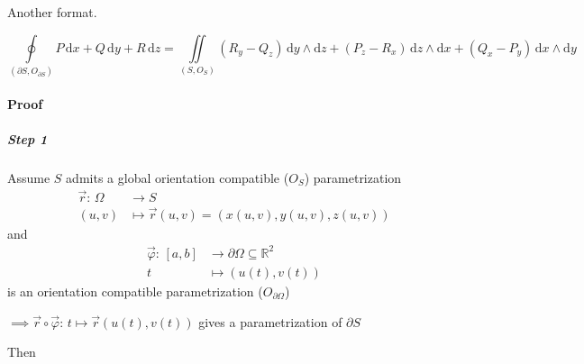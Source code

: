 Another format.

$$
    \oint\limits_{(\partial S,O_{\partial S})}P\,\mathrm{d}x+Q\,\mathrm{d}y+R\,\mathrm{d}z=\iint\limits_{(S,O_S)}(R_y-Q_z)\,\mathrm{d}y\wedge\mathrm{d}z+(P_z-R_x)\,\mathrm{d}z\wedge\mathrm{d}x+(Q_x-P_y)\,\mathrm{d}x\wedge\mathrm{d}y
$$

\paragraph*{Proof}

\subparagraph*{Step 1}

Assume $S$ admits a global orientation compatible ($O_S$) parametrization
\begin{align*}
    \overrightarrow{r}:\,\Omega & \to S                                                 \\
    (u,v)                       & \mapsto\overrightarrow{r}(u,v)=(x(u,v),y(u,v),z(u,v))
\end{align*}
and
\begin{align*}
    \overrightarrow{\varphi}:\,[a,b] & \to\partial\Omega\subseteq\mathbb{R}^2 \\
    t                                & \mapsto(u(t),v(t))
\end{align*}
is an orientation compatible parametrization ($O_{\partial\Omega}$)

$\implies\overrightarrow{r}\circ\overrightarrow{\varphi}:\,t\mapsto\overrightarrow{r}(u(t),v(t))$ gives a parametrization of $\partial S$

Then


